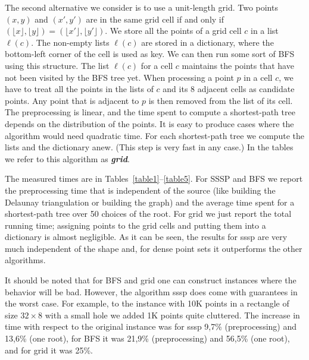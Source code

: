 \documentclass[a4paper,USenglish]{lipics}
\def\DEF#1{\textbf{\emph{#1}}}
\begin{document}
The second alternative we consider is to use a unit-length grid. 
Two points $(x,y)$ and $(x',y')$ are in the same grid cell
if and only if 
$(\lfloor x\rfloor ,\lfloor y\rfloor)=(\lfloor x'\rfloor ,\lfloor y'\rfloor)$.
We store all the points of a grid cell $c$ in a list $\ell(c)$.
The non-empty lists $\ell(c)$ are stored in a dictionary,
where the bottom-left corner of the cell is used as key.
We can then run some sort of BFS using this structure. 
The list $\ell(c)$ for a cell $c$ maintains the points that
have not been visited by the BFS tree yet. When processing
a point $p$ in a cell $c$, we have to treat all the points 
in the lists of $c$ and its $8$ adjacent cells as candidate points.
Any point that is adjacent to $p$ is then removed from the list of its cell. 
The preprocessing is linear, and the time spent to compute
a shortest-path tree depends on the distribution of the points.
It is easy to produce cases where the algorithm would need quadratic time.
For each shortest-path tree we compute the lists and the dictionary anew.
(This step is very fast in any case.)
In the tables we refer to this algorithm as \DEF{grid}.

The measured times are in Tables~\ref{table1}--\ref{table5}.
For SSSP and BFS we report the preprocessing time that is independent of the source
(like building the Delaunay triangulation or building the graph) and the average
time spent for a shortest-path tree over 50 choices of the root.
For grid we just report the total running time; assigning points to
the grid cells and putting them into a dictionary is almost negligible.
As it can be seen, the results for sssp are very much independent of the shape and,
for dense point sets it outperforms the other algorithms.

It should be noted that for BFS and grid one can construct instances 
where the behavior will be bad. However, the algorithm sssp does come with guarantees
in the worst case. For example, 
to the instance with 10K points in a rectangle of size $32\times 8$ with a small hole
we added 1K points quite cluttered. 
The increase in time with respect to the original instance 
was for sssp 9,7\% (preprocessing) and 13,6\% (one root), for BFS it was
21,9\% (preprocessing) and 56,5\% (one root), and for grid it was 25\%.
\end{document}
